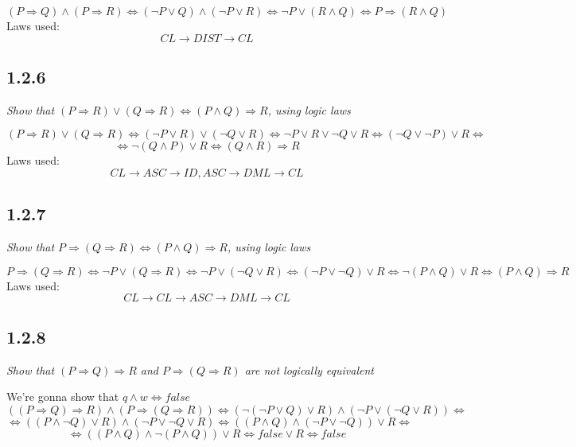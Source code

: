 \documentclass[11pt,oneside,titlepage]{book}
\DeclareMathOperator \eqv {\Leftrightarrow}
\DeclareMathOperator \imp {\Rightarrow}
\begin{document}
$$(P \imp Q) \land (P \imp R) \eqv (\neg P \lor Q) \land (\neg P \lor R) \eqv
\neg P  \lor (R \land Q) \eqv  P  \imp (R \land Q) $$
Laws used: 
$$CL \to DIST \to CL$$

\subsection*{1.2.6}

\textit{Show that $(P \imp R) \lor (Q \imp R) \eqv (P \land Q) \imp R$, using logic laws}

$$(P \imp R) \lor (Q \imp R)  \eqv (\neg P \lor R) \lor (\neg Q \lor R) \eqv
\neg P \lor R \lor \neg Q \lor R \eqv (\neg Q \lor \neg P) \lor R \eqv$$
$$ \eqv \neg (Q \land P) \lor R
\eqv (Q \land R) \imp R$$
Laws used:
$$CL \to ASC \to ID, ASC \to DML \to CL$$

\subsection*{1.2.7}

\textit{Show that $P \imp (Q \imp R) \eqv (P \land Q) \imp R$, using logic laws}

$$P \imp (Q \imp R) \eqv \neg P \lor (Q \imp R) \eqv \neg P \lor (\neg Q \lor R) \eqv
(\neg P \lor \neg Q) \lor R \eqv \neg (P \land Q) \lor R \eqv (P \land Q) \imp R$$
Laws used:
$$CL \to CL \to ASC \to DML \to CL$$

\subsection*{1.2.8}

\textit{Show that $(P \imp Q) \imp R$ and $P \imp (Q \imp R)$ are not logically equivalent}

We're gonna show that $q \land w \eqv false$
$$((P \imp Q) \imp R) \land (P \imp (Q \imp R)) \eqv (\neg (\neg P \lor Q) \lor R) \land
(\neg P \lor (\neg Q \lor R)) \eqv $$
$$\eqv ((P \land \neg Q) \lor R) \land (\neg P \lor \neg Q \lor R) \eqv
((P \land Q) \land (\neg P \lor \neg Q)) \lor R  \eqv$$
$$ \eqv ((P \land Q) \land \neg ( P \land  Q)) \lor R  \eqv false \lor R \eqv false$$
\end{document}
